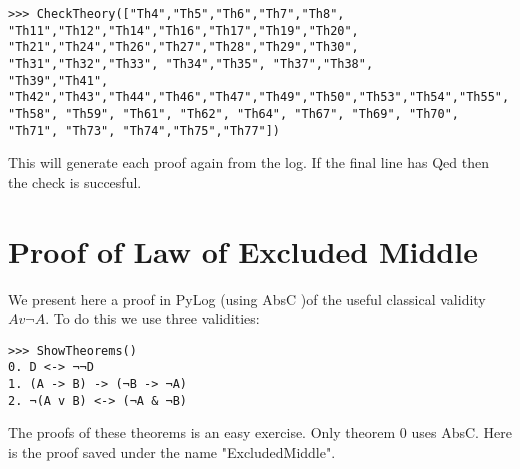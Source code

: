 \documentclass[12pt,leqno]{article}
\numberwithin{equation}{section}
\begin{document}
\begin{verbatim}
>>> CheckTheory(["Th4","Th5","Th6","Th7","Th8",
"Th11","Th12","Th14","Th16","Th17","Th19","Th20",
"Th21","Th24","Th26","Th27","Th28","Th29","Th30",
"Th31","Th32","Th33", "Th34","Th35", "Th37","Th38",
"Th39","Th41", "Th42","Th43","Th44","Th46","Th47","Th49","Th50","Th53","Th54","Th55", "Th58", "Th59", "Th61", "Th62", "Th64", "Th67", "Th69", "Th70", "Th71", "Th73", "Th74","Th75","Th77"])
\end{verbatim}

This will generate each proof again from the log. If the final line has Qed then the check is succesful.

\section*{Proof of Law of Excluded Middle}

We present here a proof in PyLog (using AbsC )of the useful classical validity $A v \neg A$. To do this we use
three validities:

\begin{verbatim}
>>> ShowTheorems()
0. D <-> ¬¬D 
1. (A -> B) -> (¬B -> ¬A) 
2. ¬(A v B) <-> (¬A & ¬B) 
\end{verbatim}

The proofs of these theorems is an easy exercise. Only theorem 0 uses AbsC. Here is the proof saved under the name "ExcludedMiddle".
\end{document}
